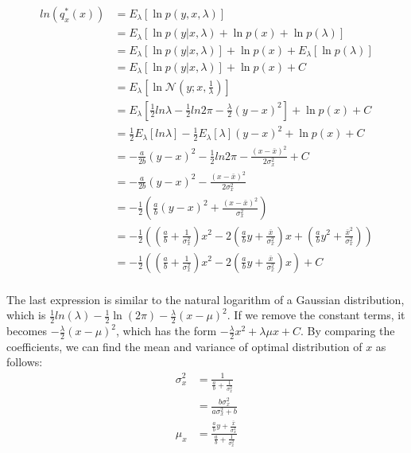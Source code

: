 \documentclass{article}
\begin{document}
\[
    \begin{aligned}
        ln(q_x^*(x)) &= E_{\lambda}\left[ \ln p(y,x,\lambda) \right] \\
                     &= E_{\lambda}\left[ \ln p(y|x,\lambda) + \ln p(x) + \ln p(\lambda) \right] \\
                        &= E_{\lambda}\left[ \ln p(y|x,\lambda) \right] + \ln p(x) + E_{\lambda}\left[ \ln p(\lambda) \right] \\
                        &= E_{\lambda}\left[ \ln p(y|x,\lambda) \right] + \ln p(x) + C \\
                        &= E_{\lambda}\left[ \ln \mathcal{N}(y;x,\frac{1}{\lambda}) \right] \\
                        &= E_{\lambda}\left[ \frac{1}{2} ln \lambda - \frac{1}{2} ln 2\pi - \frac{\lambda}{2}(y-x)^2 \right] + \ln p(x) + C \\
                        &= \frac{1}{2} E_{\lambda}\left[ ln \lambda \right] - \frac{1}{2} E_{\lambda}\left[ \lambda \right](y-x)^2 + \ln p(x) + C \\
                        &= - \frac{a}{2b}(y-x)^2 - \frac{1}{2} ln 2\pi - \frac{(x-\bar{x})^2}{2\sigma_x^2} + C \\
                        &= -\frac{a}{2b}(y-x)^2 - \frac{(x-\bar{x})^2}{2\sigma_x^2} \\
                        &= -\frac{1}{2}\left( \frac{a}{b}(y-x)^2 + \frac{(x-\bar{x})^2}{\sigma_x^2} \right) \\
                        &= -\frac{1}{2}\left( \left(\frac{a}{b} + \frac{1}{\sigma_x^2}\right)x^2 - 2\left(\frac{a}{b}y + \frac{\bar{x}}{\sigma_x^2}\right)x + \left(\frac{a}{b}y^2 + \frac{\bar{x}^2}{\sigma_x^2}\right) \right) \\
                        &= -\frac{1}{2}\left( \left(\frac{a}{b} + \frac{1}{\sigma_x^2}\right)x^2 - 2\left(\frac{a}{b}y + \frac{\bar{x}}{\sigma_x^2}\right)x \right) + C \\
    \end{aligned}
\]

The last expression is similar to the natural logarithm of a Gaussian distribution, which is $\frac{1}{2}ln(\lambda)-\frac{1}{2}\ln(2\pi) - \frac{\lambda}{2}(x-\mu)^2$. If we
remove the constant terms, it becomes $- \frac{\lambda}{2}(x-\mu)^2$, which has the form $- \frac{\lambda}{2}x^2 + \lambda\mu x + C$. By comparing the coefficients, 
we can find the mean and variance of optimal distribution of $x$ as follows:
\[
    \begin{aligned}
        \sigma_x^2 &= \frac{1}{\frac{a}{b} + \frac{1}{\sigma_x^2}} \\
                 &= \frac{b\sigma_x^2}{a\sigma_x^2 + b} \\
        \mu_x &= \frac{\frac{a}{b}y + \frac{\bar{x}}{\sigma_x^2}}{\frac{a}{b} + \frac{1}{\sigma_x^2}} \\
    \end{aligned}
\]
\end{document}
